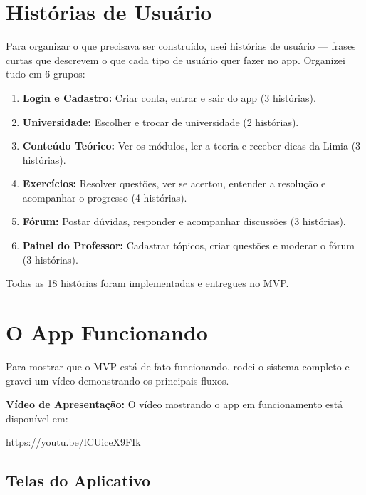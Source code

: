 \documentclass[12pt, a4paper]{article}
\begin{document}
\section{Hist\'{o}rias de Usu\'{a}rio}

Para organizar o que precisava ser constru\'{i}do, usei hist\'{o}rias de usu\'{a}rio --- frases curtas que descrevem o que cada tipo de usu\'{a}rio quer fazer no app. Organizei tudo em 6 grupos:

\begin{enumerate}[leftmargin=2cm]
  \item \textbf{Login e Cadastro:} Criar conta, entrar e sair do app (3 hist\'{o}rias).
  \item \textbf{Universidade:} Escolher e trocar de universidade (2 hist\'{o}rias).
  \item \textbf{Conte\'{u}do Te\'{o}rico:} Ver os m\'{o}dulos, ler a teoria e receber dicas da Limia (3 hist\'{o}rias).
  \item \textbf{Exerc\'{i}cios:} Resolver quest\~{o}es, ver se acertou, entender a resolu\c{c}\~{a}o e acompanhar o progresso (4 hist\'{o}rias).
  \item \textbf{F\'{o}rum:} Postar d\'{u}vidas, responder e acompanhar discuss\~{o}es (3 hist\'{o}rias).
  \item \textbf{Painel do Professor:} Cadastrar t\'{o}picos, criar quest\~{o}es e moderar o f\'{o}rum (3 hist\'{o}rias).
\end{enumerate}

Todas as 18 hist\'{o}rias foram implementadas e entregues no MVP.

\section{O App Funcionando}
\label{sec:demonstracao}

Para mostrar que o MVP est\'{a} de fato funcionando, rodei o sistema completo e gravei um v\'{i}deo demonstrando os principais fluxos.

\noindent\textbf{V\'{i}deo de Apresenta\c{c}\~{a}o:} O v\'{i}deo mostrando o app em funcionamento est\'{a} dispon\'{i}vel em:
\begin{center}
	\url{https://youtu.be/lCUiceX9FIk}
\end{center}

\subsection{Telas do Aplicativo}
\end{document}
